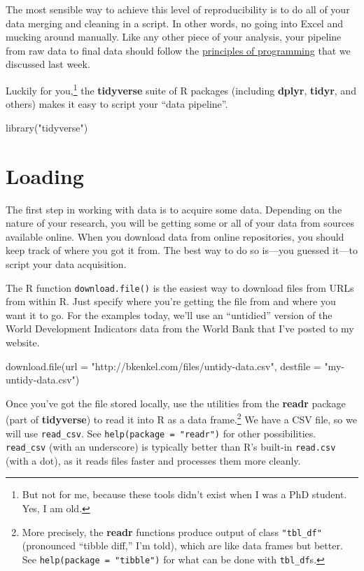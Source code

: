 \documentclass[
  12pt,
  oneside,openany]{book}
\newenvironment{Shaded}{\begin{snugshade}}{\end{snugshade}}
\newcommand{\AttributeTok}[1]{\textcolor[rgb]{0.77,0.63,0.00}{#1}}
\newcommand{\FunctionTok}[1]{\textcolor[rgb]{0.00,0.00,0.00}{#1}}
\newcommand{\NormalTok}[1]{#1}
\newcommand{\StringTok}[1]{\textcolor[rgb]{0.31,0.60,0.02}{#1}}
\begin{document}
The most sensible way to achieve this level of reproducibility is to do all of your data merging and cleaning in a script. In other words, no going into Excel and mucking around manually. Like any other piece of your analysis, your pipeline from raw data to final data should follow the \protect\hyperlink{programming}{principles of programming} that we discussed last week.

Luckily for you,\footnote{But not for me, because these tools didn't exist when I was a PhD student. Yes, I am old.} the \textbf{tidyverse} suite of R packages (including \textbf{dplyr}, \textbf{tidyr}, and others) makes it easy to script your ``data pipeline''.

\begin{Shaded}
\begin{Highlighting}[]
\FunctionTok{library}\NormalTok{(}\StringTok{"tidyverse"}\NormalTok{)}
\end{Highlighting}
\end{Shaded}

\hypertarget{loading}{%
\section{Loading}\label{loading}}

The first step in working with data is to acquire some data. Depending on the nature of your research, you will be getting some or all of your data from sources available online. When you download data from online repositories, you should keep track of where you got it from. The best way to do so is---you guessed it---to script your data acquisition.

The R function \texttt{download.file()} is the easiest way to download files from URLs from within R. Just specify where you're getting the file from and where you want it to go. For the examples today, we'll use an ``untidied'' version of the World Development Indicators data from the World Bank that I've posted to my website.

\begin{Shaded}
\begin{Highlighting}[]
\FunctionTok{download.file}\NormalTok{(}\AttributeTok{url =} \StringTok{"http://bkenkel.com/files/untidy{-}data.csv"}\NormalTok{,}
              \AttributeTok{destfile =} \StringTok{"my{-}untidy{-}data.csv"}\NormalTok{)}
\end{Highlighting}
\end{Shaded}

Once you've got the file stored locally, use the utilities from the \textbf{readr} package (part of \textbf{tidyverse}) to read it into R as a data frame.\footnote{More precisely, the \textbf{readr} functions produce output of class \texttt{"tbl\_df"} (pronounced ``tibble diff,'' I'm told), which are like data frames but better. See \texttt{help(package\ =\ "tibble")} for what can be done with \texttt{tbl\_df}s.} We have a CSV file, so we will use \texttt{read\_csv}. See \texttt{help(package\ =\ "readr")} for other possibilities.
\texttt{read\_csv} (with an underscore) is typically better than R's built-in \texttt{read.csv} (with a dot), as it reads files faster and processes them more cleanly.
\end{document}
